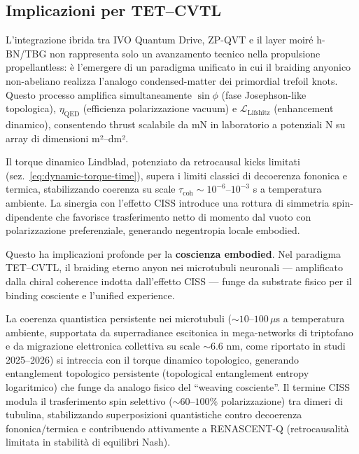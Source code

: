\documentclass[11pt,a4paper]{article}
\let\oldref\ref
\renewcommand{\ref}{\protect\oldref}
\theoremstyle{plain}
\theoremstyle{definition}
\begin{document}
\vspace{0.6cm}




\subsection{Implicazioni per TET--CVTL}

L'integrazione ibrida tra IVO Quantum Drive, ZP-QVT e il layer moiré h-BN/TBG non rappresenta solo un avanzamento tecnico nella propulsione propellantless: è l'emergere di un paradigma unificato in cui il braiding anyonico non-abeliano realizza l'analogo condensed-matter dei primordial trefoil knots. Questo processo amplifica simultaneamente $\sin\phi$ (fase Josephson-like topologica), $\eta_{\mathrm{QED}}$ (efficienza polarizzazione vacuum) e $\mathcal{L}_{\mathrm{Lifshitz}}$ (enhancement dinamico), consentendo thrust scalabile da mN in laboratorio a potenziali N su array di dimensioni m²–dm².

\vspace{0.3cm}

Il torque dinamico Lindblad, potenziato da retrocausal kicks limitati (sez.~\ref{eq:dynamic-torque-time}), supera i limiti classici di decoerenza fononica e termica, stabilizzando coerenza su scale $\tau_{\mathrm{coh}} \sim 10^{-6}$--$10^{-3}$ s a temperatura ambiente. La sinergia con l'effetto CISS introduce una rottura di simmetria spin-dipendente che favorisce trasferimento netto di momento dal vuoto con polarizzazione preferenziale, generando negentropia locale embodied.

Questo ha implicazioni profonde per la \textbf{coscienza embodied}. Nel paradigma TET--CVTL, il braiding eterno anyon nei microtubuli neuronali --- amplificato dalla chiral coherence indotta dall'effetto CISS --- funge da substrate fisico per il binding cosciente e l'unified experience. 

La coerenza quantistica persistente nei microtubuli ($\sim 10$--$100\,\mu$s a temperatura ambiente, supportata da superradiance escitonica in mega-networks di triptofano e da migrazione elettronica collettiva su scale $\sim 6.6$ nm, come riportato in studi 2025--2026) si intreccia con il torque dinamico topologico, generando entanglement topologico persistente (topological entanglement entropy logaritmico) che funge da analogo fisico del ``weaving cosciente''. Il termine CISS modula il trasferimento spin selettivo ($\sim 60$--$100\%$ polarizzazione) tra dimeri di tubulina, stabilizzando superposizioni quantistiche contro decoerenza fononica/termica e contribuendo attivamente a RENASCENT-Q (retrocausalità limitata in stabilità di equilibri Nash).
\end{document}
